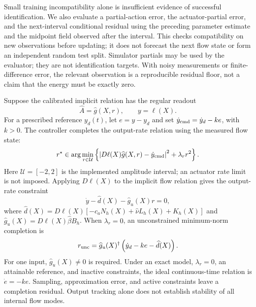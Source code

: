 \documentclass[10pt]{article}
\begin{document}
Small training incompatibility alone is insufficient evidence of successful
identification. We also evaluate a partial-action error, the actuator-partial
error, and the next-interval conditional residual using the preceding
parameter estimate and the midpoint field observed after the interval.
This checks compatibility on new observations before updating; it does not
forecast the next flow state or form an independent random test split.
Simulator partials may be used by the evaluator; they are
not identification targets. With noisy measurements or finite-difference error,
the relevant observation is a reproducible residual floor, not a claim that
the energy must be exactly zero.

Suppose the calibrated implicit relation has the regular readout
\begin{equation}
 \widehat A=\widehat g(X,r),\qquad y=\ell(X).
 \label{eq:afc_forward_readout}
\end{equation}
For a prescribed reference $y_d(t)$, let $e=y-y_d$ and set
$\dot y_{\rm cmd}=\dot y_d-ke$, with $k>0$. The controller completes the
output-rate relation using the measured flow state:
\begin{equation}
 r^\star\in\arg\min_{r\in\mathcal U}
 \left\{\left|D\ell(X)\widehat g(X,r)-\dot y_{\rm cmd}\right|^2
 +\lambda_r r^2\right\}.
 \label{eq:afc_control}
\end{equation}
Here $\mathcal U=[-2,2]$ is the implemented amplitude interval; an actuator
rate limit is not imposed. Applying $D\ell(X)$ to the implicit flow
relation gives the output-rate constraint
\begin{equation}
 \dot y-\widehat d(X)-\widehat g_u(X)r=0,
 \label{eq:afc_output_constraint}
\end{equation}
where $\widehat d(X)=D\ell(X)[-\widehat c_aN_h(X)
+\widehat\nu L_h(X)+K_h(X)]$ and
$\widehat g_u(X)=D\ell(X)\widehat\beta B_h$.
When $\lambda_r=0$, an unconstrained minimum-norm completion is
\begin{equation}
 r_{\rm unc}=\widehat g_u(X)^\dagger
 \left(\dot y_d-ke-\widehat d(X)\right).
 \label{eq:afc_pinv}
\end{equation}
For one input, $\widehat g_u(X)\ne0$ is required. Under an exact model,
$\lambda_r=0$, an attainable reference, and inactive constraints,
the ideal continuous-time relation is
$\dot e=-ke$. Sampling, approximation error, and active constraints leave a
completion residual. Output tracking alone does not establish stability of
all internal flow modes.
\end{document}
